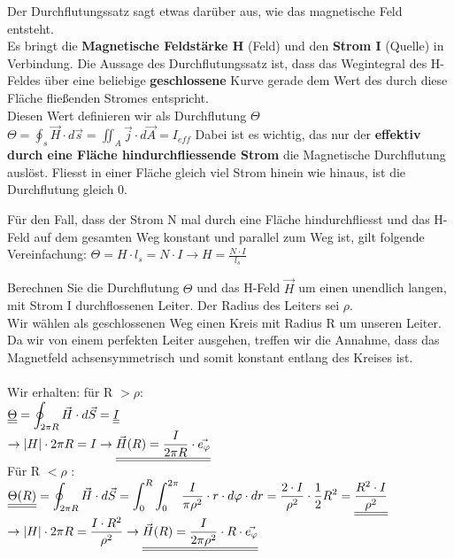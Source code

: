	\begingl
	Der Durchflutungssatz sagt etwas darüber aus, wie das magnetische Feld entsteht. \\
	 Es bringt die \textbf{Magnetische Feldstärke H} (Feld) und den \textbf{Strom I} (Quelle) in Verbindung.
	Die Aussage des Durchflutungssatz ist, dass das Wegintegral des H-Feldes über eine beliebige \textbf{geschlossene} Kurve gerade dem Wert des durch diese Fläche fließenden Stromes entspricht. \\
	Diesen Wert definieren wir als Durchflutung $\Theta$ \\
	\formulaBegin
	$\displaystyle \Theta = \oint_{s} \vec{H} \cdot d\vec{s} = \iint_{A} \vec{j} \cdot d\vec{A} = I_{eff}$
	\formulaEnd
	Dabei ist es wichtig, das nur der \textbf{effektiv durch eine Fläche hindurchfliessende Strom} die Magnetische Durchflutung auslöst. Fliesst in einer Fläche gleich viel Strom hinein wie hinaus, ist die Durchflutung gleich 0.
	\iend

	\begingl
	Für den Fall, dass der Strom N mal durch eine Fläche hindurchfliesst und das H-Feld auf dem gesamten Weg konstant und parallel zum Weg ist, gilt folgende Vereinfachung:
	\formulaBegin
	$\displaystyle \Theta = H \cdot l_s = N\cdot I \rightarrow H = \frac{N \cdot I}{l_s}$
	\formulaEnd
	\iend

	\beginbsp
	Berechnen Sie die Durchflutung $\Theta$ und das H-Feld $\vec{H}$ um einen unendlich langen, mit Strom I durchflossenen Leiter. Der Radius des Leiters sei $\rho$. \\
	\iend
	\beginbsp
	Wir wählen als geschlossenen Weg einen Kreis mit Radius R um unseren Leiter. \\
	Da wir von einem perfekten Leiter ausgehen, treffen wir die Annahme, dass das Magnetfeld achsensymmetrisch und somit konstant entlang des Kreises ist. \\
	\\
	Wir erhalten: für R $ > \rho$: \\
	$\displaystyle  \underline{\underline{\Theta}} =  \oint_{2\pi R} \vec{H} \cdot d\vec{S} = \underline{\underline{I}} $ \\
	$ \displaystyle \rightarrow |H| \cdot 2 \pi R = I \rightarrow \underline{\underline{\vec{H}(R) = \frac{I}{2 \pi R} \cdot \vec{e_{\varphi}}}} $\\

	Für R $ < \rho $ : \\
	$\displaystyle  \underline{\underline{\Theta(R)}} =  \oint_{2\pi R} \vec{H} \cdot d\vec{S} =\int_{0}^{R} \int_{0}^{2\pi} \frac{I}{\pi{\rho}^2} \cdot r \cdot d\varphi  \cdot dr  = \frac{2 \cdot I}{\rho^2} \cdot \frac{1}{2} R^2 =  \underline{\underline{\frac{R^2\cdot I}{\rho^2}}} 		  $ \\
	$ \displaystyle \rightarrow |H| \cdot 2 \pi R = \frac{I \cdot R^2}{\rho^2} \rightarrow \underline{\underline{\vec{H}(R) = \frac{I}{2\pi \rho^2} \cdot R \cdot \vec{e_{\varphi}}}} $

